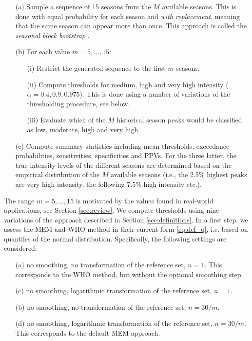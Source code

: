 \documentclass[12pt]{article}
\begin{document}
\begin{itemize}
\item[(a)] Sample a sequence of 15 seasons from the $M$ available seasons. This is done with equal probability for each season and \textit{with replacement}, meaning that the same season can appear more than once. This approach is called the \textit{seasonal block bootstrap} \citep{Politis2001}.
\item[(b)] For each value $m = 5, \dots, 15$:
\begin{itemize}
\item[(i)] Restrict the generated sequence to the first $m$ seasons.
\item[(ii)] Compute thresholds for medium, high and very high intensity ($\alpha = 0.4, 0.9, 0.975$). This is done using a number of variations of the thresholding procedure, see below.
\item[(iii)] Evaluate which of the $M$ historical season peaks would be classified as low, moderate, high and very high.
\end{itemize}
\item[(c)] Compute summary statistics including mean thresholds, exceedance probabilities, sensitivities, specificities and PPVs. For the three latter, the true intensity levels of the different seasons are determined based on the empirical distribution of the $M$ available seasons (i.e., the 2.5\% highest peaks are very high intensity, the following 7.5\% high intensity etc.).
\end{itemize}
The range $m =5, \dots, 15$ is motivated by the values found in real-world applications, see Section \ref{sec:review}. We compute thresholds using nine variations of the approach described in Section \ref{sec:definitions}. In a first step, we assess the MEM and WHO method in their current form \eqref{eq:def_q}, i.e. based on quantiles of the normal distribution. Specifically, the following settings are considered:
\begin{enumerate}
\item[(a)] no smoothing, no transformation of the reference set, $n = 1$. This corresponds to the WHO method, but without the optional smoothing step.
\item[(c)] no smoothing, logarithmic transformation of the reference set, $n = 1$.
\item[(b)] no smoothing, no transformation of the reference set, $n = 30/m$.
\item[(d)] no smoothing, logarithmic transformation of the reference set, $n = 30/m$. This corresponds to the default MEM approach.
\end{enumerate}
\end{document}
